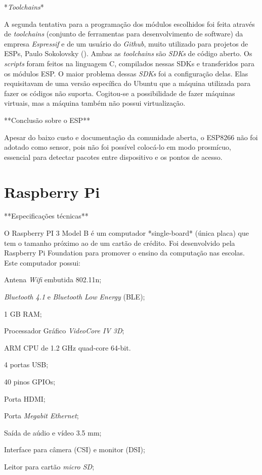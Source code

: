 *\emph{Toolchains}*

A segunda tentativa para a programação  dos módulos escolhidos foi feita através
de \emph{toolchains} (conjunto de ferramentas para desenvolvimento de software) da
empresa \emph{Espressif} e de um usuário do \emph{Github}, muito utilizado para projetos de
ESPs, Paulo Sokolovsky (\cite{pfalcon}). Ambas as \emph{toolchains} são \emph{SDKs} de código
aberto. Os \emph{scripts} foram feitos na linguagem C, compilados nessas SDKs e
transferidos para os módulos ESP. O maior problema dessas \emph{SDKs} foi a
configuração delas. Elas requisitavam de uma versão específica do Ubuntu que a
máquina utilizada para  fazer os códigos não suporta. Cogitou-se a possibilidade
de fazer máquinas virtuais, mas a máquina também não possui virtualização.

**Conclusão sobre o ESP**

Apesar do baixo custo e documentação da comunidade aberta, o ESP8266 não foi
adotado como sensor, pois não foi possível colocá-lo em modo prosmícuo,
essencial para detectar pacotes entre dispositivo e os pontos de acesso.

\section{Raspberry Pi}

**Especificações técnicas**

O Raspberry PI 3 Model B é um computador *single-board* (única placa) que tem o
tamanho próximo ao de um cartão de crédito. Foi desenvolvido pela Raspberry Pi
Foundation para promover o ensino da computação nas escolas. Este computador
possui:


\begin{alineas}
	\item Antena \emph{Wifi} embutida 802.11n;

	\item \emph{Bluetooth 4.1} e \emph{Bluetooth Low Energy} (BLE);

	\item 1 GB RAM;

	\item Processador Gráfico \emph{VideoCore IV 3D};

	\item ARM CPU de 1.2 GHz quad-core 64-bit.

	\item 4 portas USB;

	\item 40 pinos GPIOs;

	\item Porta HDMI;

	\item Porta \emph{Megabit Ethernet};

	\item Saída de aúdio e vídeo 3.5 mm;

	\item Interface para câmera (CSI) e monitor (DSI);

	\item Leitor para cartão \emph{micro SD};

\end{alineas}

